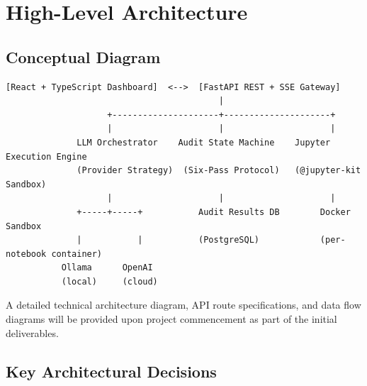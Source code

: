 \documentclass[11pt, a4paper]{article}
\begin{document}
\section{High-Level Architecture}

\subsection*{Conceptual Diagram}

\begin{verbatim}
[React + TypeScript Dashboard]  <-->  [FastAPI REST + SSE Gateway]
                                          |
                    +---------------------+---------------------+
                    |                     |                     |
              LLM Orchestrator    Audit State Machine    Jupyter Execution Engine
              (Provider Strategy)  (Six-Pass Protocol)   (@jupyter-kit Sandbox)
                    |                     |                     |
              +-----+-----+           Audit Results DB        Docker Sandbox
              |           |           (PostgreSQL)            (per-notebook container)
           Ollama      OpenAI
           (local)     (cloud)
\end{verbatim}

A detailed technical architecture diagram, API route specifications, and data flow
diagrams will be provided upon project commencement as part of the initial
deliverables.

\subsection*{Key Architectural Decisions}
\end{document}
